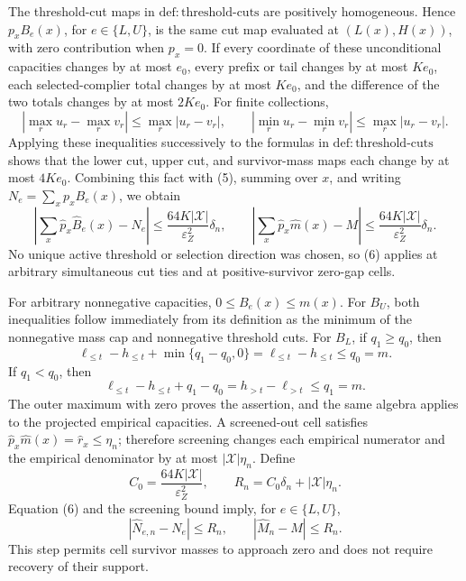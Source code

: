 The threshold-cut maps in \(\mathrm{def{:}threshold\text{-}cuts}\) are positively homogeneous.  Hence \(p_xB_e(x)\), for \(e\in\{L,U\}\), is the same cut map evaluated at \((L(x),H(x))\), with zero contribution when \(p_x=0\).  If every coordinate of these unconditional capacities changes by at most \(e_0\), every prefix or tail changes by at most \(Ke_0\), each selected-complier total changes by at most \(Ke_0\), and the difference of the two totals changes by at most \(2Ke_0\).  For finite collections,
\[
|\max_r u_r-\max_r v_r|\le\max_r|u_r-v_r|,
\qquad
|\min_r u_r-\min_r v_r|\le\max_r|u_r-v_r|.
\]
Applying these inequalities successively to the formulas in \(\mathrm{def{:}threshold\text{-}cuts}\) shows that the lower cut, upper cut, and survivor-mass maps each change by at most \(4Ke_0\).  Combining this fact with (5), summing over \(x\), and writing \(N_e=\sum_xp_xB_e(x)\), we obtain
\[
\left|\sum_x\widehat p_x\widehat B_e(x)-N_e\right|
\le\frac{64K|\mathcal X|}{\varepsilon_Z^2}\delta_n,
\qquad
\left|\sum_x\widehat p_x\widehat m(x)-M\right|
\le\frac{64K|\mathcal X|}{\varepsilon_Z^2}\delta_n.
\tag{6}
\]
No unique active threshold or selection direction was chosen, so (6) applies at arbitrary simultaneous cut ties and at positive-survivor zero-gap cells.

For arbitrary nonnegative capacities, \(0\le B_e(x)\le m(x)\).  For \(B_U\), both inequalities follow immediately from its definition as the minimum of the nonnegative mass cap and nonnegative threshold cuts.  For \(B_L\), if \(q_1\ge q_0\), then
\[
\ell_{\le t}-h_{\le t}+\min\{q_1-q_0,0\}
=\ell_{\le t}-h_{\le t}\le q_0=m.
\]
If \(q_1<q_0\), then
\[
\ell_{\le t}-h_{\le t}+q_1-q_0
=h_{>t}-\ell_{>t}\le q_1=m.
\]
The outer maximum with zero proves the assertion, and the same algebra applies to the projected empirical capacities.  A screened-out cell satisfies \(\widehat p_x\widehat m(x)=\widehat r_x\le\eta_n\); therefore screening changes each empirical numerator and the empirical denominator by at most \(|\mathcal X|\eta_n\).  Define
\[
C_0=\frac{64K|\mathcal X|}{\varepsilon_Z^2},
\qquad
R_n=C_0\delta_n+|\mathcal X|\eta_n.
\]
Equation (6) and the screening bound imply, for \(e\in\{L,U\}\),
\[
|\widehat N_{e,n}-N_e|\le R_n,
\qquad
|\widehat M_n-M|\le R_n.
\tag{7}
\]
This step permits cell survivor masses to approach zero and does not require recovery of their support.

